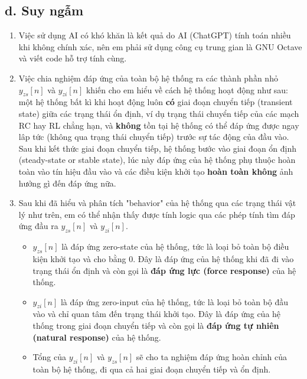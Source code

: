 \documentclass{article}
\begin{document}
\subsection*{d. Suy ngẫm}
\begin{enumerate}
\item Việc sử dụng AI có khó khăn là kết quả do AI (ChatGPT) tính toán nhiều khi không chính xác, nên em phải sử dụng công cụ trung gian là GNU Octave và viết code hỗ trợ tính cùng.
\item Việc chia nghiệm đáp ứng của toàn bộ hệ thống ra các thành phần nhỏ $y_{zs}[n]$ và $y_{zi}[n]$ khiến cho em hiểu về cách hệ thống hoạt động như sau: một hệ thống bất kì khi hoạt động luôn \textbf{có} giai đoạn chuyển tiếp (transient state) giữa các trạng thái ổn định, ví dụ trạng thái chuyển tiếp của các mạch RC hay RL chẳng hạn, và \textbf{không} tồn tại hệ thống có thể đáp ứng được ngay lâp tức (không qua trạng thái chuyển tiếp) trước sự tác động của đầu vào. Sau khi kết thức giai đoạn chuyển tiếp, hệ thống bước vào giai đoạn ổn định (steady-state or stable state), lúc này đáp ứng của hệ thống phụ thuộc hoàn toàn vào tín hiệu đầu vào và các điều kiện khởi tạo \textbf{hoàn toàn không} ảnh hưởng gì đến đáp ứng nữa.
\item Sau khi đã hiểu và phân tích "behavior" của hệ thống qua các trạng thái vật lý như trên, em có thể nhận thấy được tính logic qua các phép tính tìm đáp ứng đầu ra $y_{zs}[n]$ và $y_{zi}[n]$.
\begin{itemize}
    \item $y_{zs}[n]$ là đáp ứng zero-state của hệ thống, tức là loại bỏ toàn bộ điều kiện khởi tạo và cho bằng $0$. Đây là đáp ứng của hệ thống khi đã đi vào trạng thái ổn định và còn gọi là \textbf{đáp ứng lực (force response)} của hệ thống.
    \item $y_{zi}[n]$ là đáp ứng zero-input của hệ thống, tức là loại bỏ toàn bộ đầu vào và chỉ quan tâm đến trạng thái khởi tạo. Đây là đáp ứng của hệ thống trong giai đoạn chuyển tiếp và còn gọi là \textbf{đáp ứng tự nhiên (natural response)} của hệ thống.
    \item Tổng của $y_{zi}[n]$ và $y_{zs}[n]$ sẽ cho ta nghiệm đáp ứng hoàn chỉnh của toàn bộ hệ thống, đi qua cả hai giai đoạn chuyển tiếp và ổn định.
\end{itemize}
\end{enumerate}
\end{document}
